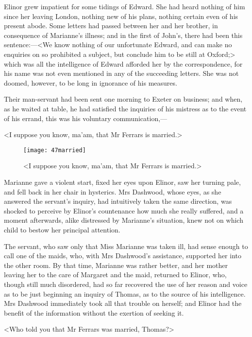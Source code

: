 Elinor grew impatient for some tidings of Edward. She had heard nothing of him since her leaving London, nothing new of his plans, nothing certain even of his present abode. Some letters had passed between her and her brother, in consequence of Marianne's illness; and in the first of John's, there had been this sentence:—<We know nothing of our unfortunate Edward, and can make no enquiries on so prohibited a subject, but conclude him to be still at Oxford;> which was all the intelligence of Edward afforded her by the correspondence, for his name was not even mentioned in any of the succeeding letters. She was not doomed, however, to be long in ignorance of his measures.

Their man-servant had been sent one morning to Exeter on business; and when, as he waited at table, he had satisfied the inquiries of his mistress as to the event of his errand, this was his voluntary communication,—

<I suppose you know, ma'am, that Mr Ferrars is married.>

\begin{figure}[tbph]
\centering
\texttt{[image: 47married]}
\caption{<I suppose you know, ma'am, that Mr Ferrars is married.>}
\end{figure}

Marianne gave a violent start, fixed her eyes upon Elinor, saw her turning pale, and fell back in her chair in hysterics. Mrs Dashwood, whose eyes, as she answered the servant's inquiry, had intuitively taken the same direction, was shocked to perceive by Elinor's countenance how much she really suffered, and a moment afterwards, alike distressed by Marianne's situation, knew not on which child to bestow her principal attention.

The servant, who saw only that Miss Marianne was taken ill, had sense enough to call one of the maids, who, with Mrs Dashwood's assistance, supported her into the other room. By that time, Marianne was rather better, and her mother leaving her to the care of Margaret and the maid, returned to Elinor, who, though still much disordered, had so far recovered the use of her reason and voice as to be just beginning an inquiry of Thomas, as to the source of his intelligence. Mrs Dashwood immediately took all that trouble on herself; and Elinor had the benefit of the information without the exertion of seeking it.

<Who told you that Mr Ferrars was married, Thomas?>

